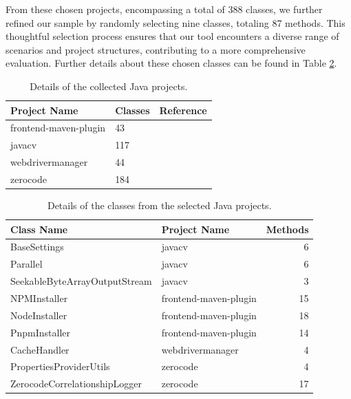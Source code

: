 From these chosen projects, encompassing a total of 388 classes, we further refined our sample by randomly selecting nine classes, totaling 87 methods. This thoughtful selection process ensures that our tool encounters a diverse range of scenarios and project structures, contributing to a more comprehensive evaluation. Further details about these chosen classes can be found in Table \ref{tab:selected_java_projects}.

\begin{table}[htbp]
    \centering
    \begin{tabular}{l | l | r}
        \textbf{Project Name} & \textbf{Classes} & \textbf{Reference} \\
        \hline
        frontend-maven-plugin & 43 & \cite{sletteberg_frontend-maven-plugin_2023} \\
        javacv & 117 & \cite{noauthor_bytedecojavacv_nodate} \\
        webdrivermanager & 44 & \cite{noauthor_bonigarciawebdrivermanager_nodate} \\
        zerocode & 184 & \cite{noauthor_authorjappszerocode_nodate} \\
    \end{tabular}
\caption{Details of the collected Java projects.}
\label{tab:collected_java_projects}
\end{table}

\begin{table}
    \centering    
    \begin{tabular}{l | l | r}
        \textbf{Class Name} & \textbf{Project Name} & \textbf{Methods} \\
        \hline
        BaseSettings & javacv & 6 \\
        Parallel & javacv & 6 \\
        SeekableByteArrayOutputStream & javacv & 3 \\
        NPMInstaller & frontend-maven-plugin & 15 \\
        NodeInstaller & frontend-maven-plugin & 18 \\
        PnpmInstaller & frontend-maven-plugin & 14 \\
        CacheHandler & webdrivermanager & 4 \\
        PropertiesProviderUtils & zerocode & 4 \\
        ZerocodeCorrelationshipLogger & zerocode & 17 \\
    \end{tabular}
\caption{Details of the classes from the selected Java projects.}
\label{tab:selected_java_projects}
\end{table}

